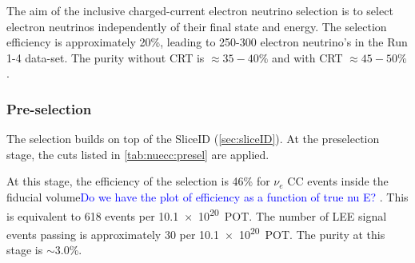 \label{sec:nueselection:inclusive}


\newcommand{\nueccinc}{$\nu_e$ CC inclusive\xspace}
\newcommand{\nueccsel}{$\nu_e$ CC inclusive selection\xspace}


The aim of the inclusive charged-current electron neutrino selection is to select electron neutrinos independently of their final state and energy. The selection efficiency is approximately 20\%, leading to 250-300 electron neutrino's in the Run 1-4 data-set. The purity without CRT is $\approx 35-40\%$ and with CRT $\approx 45-50\%$.

\subsubsection{Pre-selection}
The selection builds on top of the SliceID (\cref{sec:sliceID}). At the preselection stage,  the cuts listed in \cref{tab:nuecc:presel} are applied. %

At this stage, the efficiency of the selection is 46\% for $\nu_e$ CC events inside the fiducial volume\textcolor{blue}{Do we have the plot of efficiency as a function of true nu E? }. This is equivalent to 618 events per \SI{10.1e20}{POT}. The number of LEE signal events passing is approximately 30 per \SI{10.1e20}{POT}. The purity at this stage is $\sim$3.0\%. 

